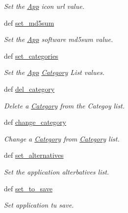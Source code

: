 \begin{CompactItemize}
\begin{CompactList}\small\item\em Set the \hyperlink{classwinsollib_1_1App}{App} icon url value. \item\end{CompactList}\item 
def \hyperlink{classwinsollib_1_1App_212c0f8cd2f5941d3fbb9e3cb31ae019}{set\_\-md5sum}
\begin{CompactList}\small\item\em Set the \hyperlink{classwinsollib_1_1App}{App} software md5sum value. \item\end{CompactList}\item 
def \hyperlink{classwinsollib_1_1App_53671291ce40f5ed9d125dec57f70902}{set\_\-categories}
\begin{CompactList}\small\item\em Set the \hyperlink{classwinsollib_1_1App}{App} \hyperlink{classwinsollib_1_1Category}{Category} List values. \item\end{CompactList}\item 
def \hyperlink{classwinsollib_1_1App_dc8477f5dbe87f5805d5571cb5197ea3}{del\_\-category}
\begin{CompactList}\small\item\em Delete a \hyperlink{classwinsollib_1_1Category}{Category} from the Categoy list. \item\end{CompactList}\item 
def \hyperlink{classwinsollib_1_1App_6c0f9ce54f06a1bef99632ae7b409d55}{change\_\-category}
\begin{CompactList}\small\item\em Change a \hyperlink{classwinsollib_1_1Category}{Category} from \hyperlink{classwinsollib_1_1Category}{Category} list. \item\end{CompactList}\item 
def \hyperlink{classwinsollib_1_1App_3d96046f852fa25380c7ac50b115ff39}{set\_\-alternatives}
\begin{CompactList}\small\item\em Set the application alterbatives list. \item\end{CompactList}\item 
def \hyperlink{classwinsollib_1_1App_360cce66bfaca9846415147efb464838}{set\_\-to\_\-save}
\begin{CompactList}\small\item\em Set application tu save. \item\end{CompactList}\item 

\end{CompactItemize}
